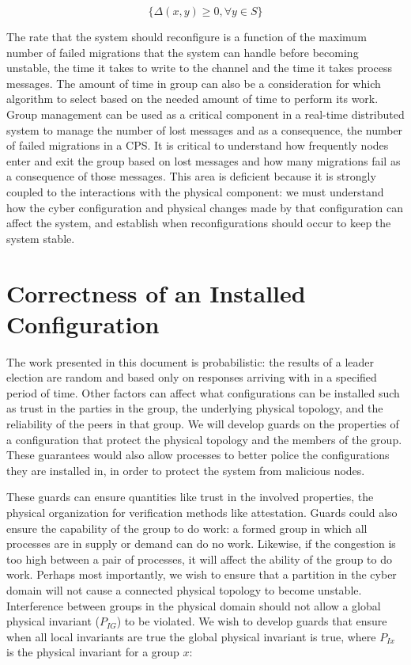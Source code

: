 \begin{equation}
\{ \Delta(x,y) \geq 0, \forall y \in S \}
\end{equation}

The rate that the system should reconfigure is a function of the maximum number of failed migrations that the system can handle before becoming unstable, the time it takes to write to the channel and the time it takes process messages.
The amount of time in group can also be a consideration for which algorithm to select based on the needed amount of time to perform its work.
Group management can be used as a critical component in a real-time distributed system to manage the number of lost messages and as a consequence, the number of failed migrations in a CPS.
It is critical to understand how frequently nodes enter and exit the group based on lost messages and how many migrations fail as a consequence of those messages.
This area is deficient because it is strongly coupled to the interactions with the physical component: we must understand how the cyber configuration and physical changes made by that configuration can affect the system, and establish when reconfigurations should occur to keep the system stable.

\section{Correctness of an Installed Configuration}

The work presented in this document is probabilistic: the results of a leader election are random and based only on responses arriving with in a specified period of time.
Other factors can affect what configurations can be installed such as trust in the parties in the group, the underlying physical topology, and the reliability of the peers in that group.
We will develop guards on the properties of a configuration that protect the physical topology and the members of the group.
These guarantees would also allow processes to better police the configurations they are installed in, in order to protect the system from malicious nodes.

These guards can ensure quantities like trust in the involved properties, the physical organization for verification methods like attestation.
Guards could also ensure the capability of the group to do work: a formed group in which all processes are in supply or demand can do no work.
Likewise, if the congestion is too high between a pair of processes, it will affect the ability of the group to do work.
Perhaps most importantly, we wish to ensure that a partition in the cyber domain will not cause a connected physical topology to become unstable.
Interference between groups in the physical domain should not allow a global physical invariant ($P_{IG}$) to be violated.
We wish to develop guards that ensure when all local invariants are true the global physical invariant is true, where $P_{Ix}$ is the physical invariant for a group $x$:

